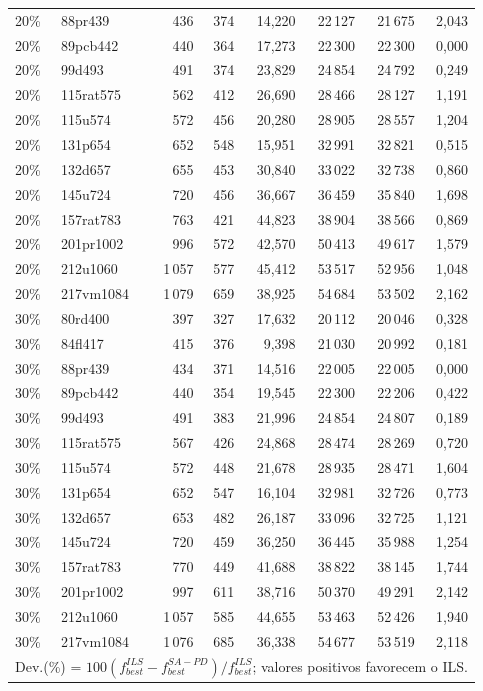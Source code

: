 \begin{longtable}{llrrr|rrr}
20\% & 88pr439 & 436 & 374 & 14{,}220 & 22\,127 & 21\,675 & 2{,}043 \\
20\% & 89pcb442 & 440 & 364 & 17{,}273 & 22\,300 & 22\,300 & 0{,}000 \\
20\% & 99d493 & 491 & 374 & 23{,}829 & 24\,854 & 24\,792 & 0{,}249 \\
20\% & 115rat575 & 562 & 412 & 26{,}690 & 28\,466 & 28\,127 & 1{,}191 \\
20\% & 115u574 & 572 & 456 & 20{,}280 & 28\,905 & 28\,557 & 1{,}204 \\
20\% & 131p654 & 652 & 548 & 15{,}951 & 32\,991 & 32\,821 & 0{,}515 \\
20\% & 132d657 & 655 & 453 & 30{,}840 & 33\,022 & 32\,738 & 0{,}860 \\
20\% & 145u724 & 720 & 456 & 36{,}667 & 36\,459 & 35\,840 & 1{,}698 \\
20\% & 157rat783 & 763 & 421 & 44{,}823 & 38\,904 & 38\,566 & 0{,}869 \\
20\% & 201pr1002 & 996 & 572 & 42{,}570 & 50\,413 & 49\,617 & 1{,}579 \\
20\% & 212u1060 & 1\,057 & 577 & 45{,}412 & 53\,517 & 52\,956 & 1{,}048 \\
20\% & 217vm1084 & 1\,079 & 659 & 38{,}925 & 54\,684 & 53\,502 & 2{,}162 \\
\midrule
30\% & 80rd400 & 397 & 327 & 17{,}632 & 20\,112 & 20\,046 & 0{,}328 \\
30\% & 84fl417 & 415 & 376 & 9{,}398 & 21\,030 & 20\,992 & 0{,}181 \\
30\% & 88pr439 & 434 & 371 & 14{,}516 & 22\,005 & 22\,005 & 0{,}000 \\
30\% & 89pcb442 & 440 & 354 & 19{,}545 & 22\,300 & 22\,206 & 0{,}422 \\
30\% & 99d493 & 491 & 383 & 21{,}996 & 24\,854 & 24\,807 & 0{,}189 \\
30\% & 115rat575 & 567 & 426 & 24{,}868 & 28\,474 & 28\,269 & 0{,}720 \\
30\% & 115u574 & 572 & 448 & 21{,}678 & 28\,935 & 28\,471 & 1{,}604 \\
30\% & 131p654 & 652 & 547 & 16{,}104 & 32\,981 & 32\,726 & 0{,}773 \\
30\% & 132d657 & 653 & 482 & 26{,}187 & 33\,096 & 32\,725 & 1{,}121 \\
30\% & 145u724 & 720 & 459 & 36{,}250 & 36\,445 & 35\,988 & 1{,}254 \\
30\% & 157rat783 & 770 & 449 & 41{,}688 & 38\,822 & 38\,145 & 1{,}744 \\
30\% & 201pr1002 & 997 & 611 & 38{,}716 & 50\,370 & 49\,291 & 2{,}142 \\
30\% & 212u1060 & 1\,057 & 585 & 44{,}655 & 53\,463 & 52\,426 & 1{,}940 \\
30\% & 217vm1084 & 1\,076 & 685 & 36{,}338 & 54\,677 & 53\,519 & 2{,}118 \\
\midrule
\multicolumn{8}{l}{\footnotesize Dev.(\%) = $100(f_{best}^{ILS}-f_{best}^{SA-PD})/f_{best}^{ILS}$; valores positivos favorecem o ILS.} \\
\bottomrule
\end{longtable}
